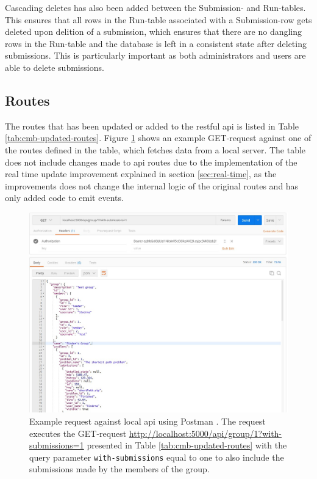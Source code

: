 Cascading deletes has also been added between the Submission- and Run-tables. This ensures that all rows in the Run-table associated with a Submission-row gets deleted upon delition of a submission, which ensures that there are no dangling rows in the Run-table and the database is left in a consistent state after deleting submissions. This is particularly important as both administrators and users are able to delete submissions.

\subsection{Routes}
The routes that has been updated or added to the \gls{rest}ful \gls{api} is listed in Table \ref{tab:cmb-updated-routes}. Figure \ref{fig:postman-request} shows an example GET-request against one of the routes defined in the table, which fetches data from a local server. The table does not include changes made to \gls{api} routes due to the implementation of the real time update improvement explained in section \ref{sec:real-time}, as the improvements does not change the internal logic of the original routes and has only added code to emit events. \\

\begin{figure}[h!]
    \centering
    \includegraphics[width=1.0\textwidth]{figs/postman_request.jpg}
    \caption[Example request against local API]{Example request against local \gls{api} using Postman \cite{POSTMAN}. The request executes the GET-request \url{http://localhost:5000/api/group/1?with-submissions=1} presented in Table \ref{tab:cmb-updated-routes} with the query parameter \texttt{with-submissions} equal to one to also include the submissions made by the members of the group.}
    \label{fig:postman-request}
\end{figure}

